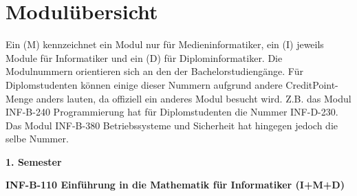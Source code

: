 \section{Modulübersicht}

Ein (M) kennzeichnet ein Modul nur für Medieninformatiker, ein (I) jeweils Module für Informatiker und ein (D) für Diplominformatiker. Die Modulnummern orientieren sich an den der Bachelorstudiengänge. Für Diplomstudenten können einige dieser Nummern aufgrund andere CreditPoint-Menge anders lauten, da offiziell ein anderes Modul besucht wird. Z.B. das Modul INF-B-240 Programmierung hat für Diplomstudenten die Nummer INF-D-230. Das Modul INF-B-380 Betriebssysteme und Sicherheit hat hingegen jedoch die selbe Nummer.

\textbf{1. Semester}

\textbf{INF-B-110 Einführung in die Mathematik für Informatiker (I+M+D)}